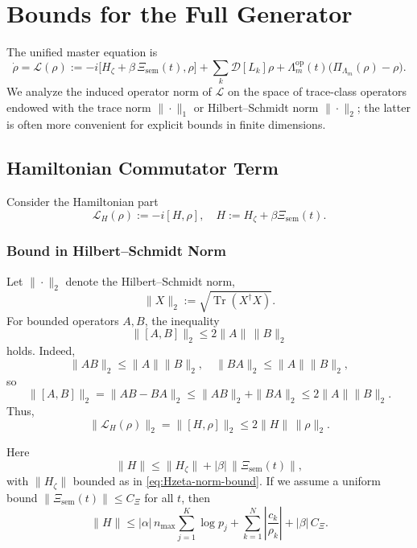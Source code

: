 \documentclass[11pt]{article}
\begin{document}
\section{Bounds for the Full Generator}

The unified master equation is
\begin{equation}
  \dot{\rho}
  = \mathcal{L}(\rho)
  := -i\bigl[H_\zeta + \beta\,\Xi_{\mathrm{sem}}(t), \rho\bigr]
     + \sum_k \mathcal{D}[L_k]\rho
     + \Lambda_m^{\mathrm{op}}(t)\bigl(\Pi_{\Lambda_m}(\rho) - \rho\bigr).
  \label{eq:L-def}
\end{equation}
We analyze the induced operator norm of \(\mathcal{L}\) on the space of trace-class operators endowed with the trace norm \(\|\cdot\|_1\) or Hilbert--Schmidt norm \(\|\cdot\|_2\); the latter is often more convenient for explicit bounds in finite dimensions.

\subsection{Hamiltonian Commutator Term}

Consider the Hamiltonian part
\[
\mathcal{L}_H(\rho) := -i[H, \rho], \quad H := H_\zeta + \beta \Xi_{\mathrm{sem}}(t).
\]

\subsubsection{Bound in Hilbert--Schmidt Norm}

Let \(\|\cdot\|_2\) denote the Hilbert--Schmidt norm,
\[
\|X\|_2 := \sqrt{\operatorname{Tr}(X^\dagger X)}.
\]
For bounded operators \(A,B\), the inequality
\[
\|[A,B]\|_2 \le 2\|A\|\,\|B\|_2
\]
holds. Indeed,
\[
\|AB\|_2 \le \|A\|\|B\|_2,\quad \|BA\|_2 \le \|A\|\|B\|_2,
\]
so
\[
\|[A,B]\|_2 = \|AB-BA\|_2
  \le \|AB\|_2 + \|BA\|_2
  \le 2\|A\|\|B\|_2.
\]
Thus,
\begin{equation}
  \|\mathcal{L}_H(\rho)\|_2
  = \|[H,\rho]\|_2
  \le 2 \|H\|\,\|\rho\|_2. \label{eq:L-HS-bound}
\end{equation}

Here
\[
\|H\| \le \|H_\zeta\| + |\beta|\,\|\Xi_{\mathrm{sem}}(t)\|,
\]
with \(\|H_\zeta\|\) bounded as in \eqref{eq:Hzeta-norm-bound}. If we assume a uniform bound \(\|\Xi_{\mathrm{sem}}(t)\| \le C_{\Xi}\) for all \(t\), then
\begin{equation}
  \|H\|
  \le |\alpha|\,n_{\max}\sum_{j=1}^K \log p_j
     + \sum_{k=1}^N \left|\frac{c_k}{\rho_k}\right|
     + |\beta|\,C_{\Xi}. \label{eq:H-total-bound}
\end{equation}
\end{document}
